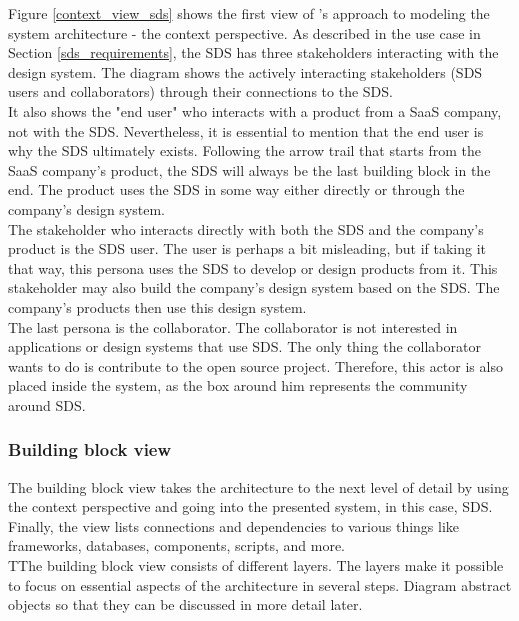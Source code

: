 Figure \ref{context_view_sds} shows the first view of \citeauthor{starke_effektive_2020}'s approach to modeling the system architecture - the context perspective. As described in the use case in Section \ref{sds_requirements}, the \ac{SDS} has three stakeholders interacting with the design system. The diagram shows the actively interacting stakeholders (\ac{SDS} users and collaborators) through their connections to the \ac{SDS}. \\
It also shows the "end user" who interacts with a product from a SaaS company, not with the \ac{SDS}. Nevertheless, it is essential to mention that the end user is why the \ac{SDS} ultimately exists. Following the arrow trail that starts from the \ac{SaaS} company's product, the \ac{SDS} will always be the last building block in the end. The product uses the \ac{SDS} in some way either directly or through the company's design system. \\
The stakeholder who interacts directly with both the SDS and the company's product is the SDS user. The user is perhaps a bit misleading, but if taking it that way, this persona uses the SDS to develop or design products from it. This stakeholder may also build the company's design system based on the SDS. The company's products then use this design system. \\
The last persona is the collaborator. The collaborator is not interested in applications or design systems that use SDS. The only thing the collaborator wants to do is contribute to the open source project. Therefore, this actor is also placed inside the system, as the box around him represents the community around \ac{SDS}. 

\subsubsection{Building block view}
The building block view takes the architecture to the next level of detail by using the context perspective and going into the presented system, in this case, \ac{SDS}. Finally, the view lists connections and dependencies to various things like frameworks, databases, components, scripts, and more.  \\
TThe building block view consists of different layers. The layers make it possible to focus on essential aspects of the architecture in several steps. Diagram abstract objects so that they can be discussed in more detail later. \cite{starke_effektive_2020} \\

